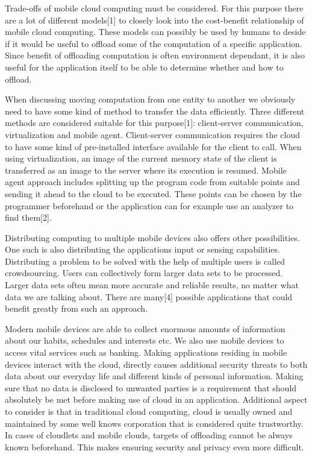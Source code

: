 \documentclass[conference]{IEEEtran}
\begin{document}
\par
Trade-offs of mobile cloud computing must be considered. For this purpose there are a lot of different models[1] to closely look into the cost-benefit relationship of mobile cloud computing. These models can possibly be used by humans to deside if it would be useful to offload some of the computation of a specific application. Since benefit of offloading computation is often environment dependant, it is also useful for the application itself to be able to determine whether and how to offload.
\par
When discussing moving computation from one entity to another we obviously need to have some kind of method to transfer the data efficiently. Three different methods are considered suitable for this purpose[1]: client-server communication, virtualization and mobile agent. Client-server communication requires the cloud to have some kind of pre-installed interface available for the client to call. When using virtualization, an image of the current memory state of the client is transferred as an image to the server where its execution is resumed. Mobile agent approach includes splitting up the program code from suitable points and sending it ahead to the cloud to be executed. These points can be chosen by the programmer beforehand or the application can for example use an analyzer to find them[2].
\par
Distributing computing to multiple mobile devices also offers other possibilities. One such is also distributing the applications input or sensing capabilities. Distributing a problem to be solved with the help of multiple users is called crowdsourcing. Users can collectively form larger data sets to be processed. Larger data sets often mean more accurate and reliable results, no matter what data we are talking about. There are many[4] possible applications that could benefit greatly from such an approach.
\par
Modern mobile devices are able to collect enormous amounts of information about our habits, schedules and interests etc. We also use mobile devices to access vital services such as banking. Making applications residing in mobile devices interact with the cloud, directly causes additional security threats to both data about our everyday life and different kinds of personal information. Making sure that no data is disclosed to unwanted parties is a requirement that should absolutely be met before making use of cloud in an application. Additional aspect to consider is that in traditional cloud computing, cloud is usually owned and maintained by some well knows corporation that is considered quite trustworthy. In cases of cloudlets and mobile clouds, targets of offloading cannot be always known beforehand. This makes ensuring security and privacy even more difficult.
\end{document}
